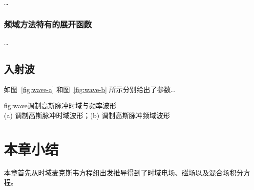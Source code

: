 \ldots

\subsubsection{频域方法特有的展开函数}

\ldots

\subsection{入射波}

如图~\ref{fig:wave-a} 和图~\ref{fig:wave-b} 所示分别给出了参数\ldots

\begin{Figure}{fig:wave}{调制高斯脉冲时域与频率波形\\
      (a) 调制高斯脉冲时域波形；(b) 调制高斯脉冲频域波形}
\end{Figure}

\section{本章小结}

本章首先从时域麦克斯韦方程组出发推导得到了时域电场、磁场以及混合场积分方程。
